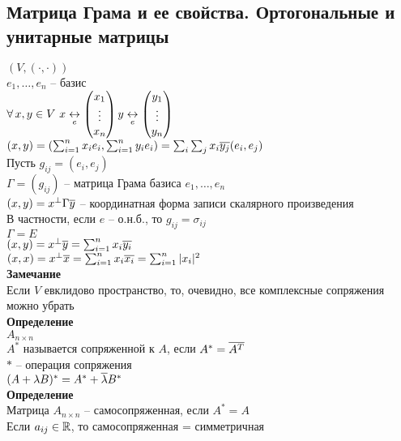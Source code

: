 \documentclass[12pt]{article}
\begin{document}
\subsection{Матрица Грама и ее свойства. Ортогональные и унитарные матрицы}
$(V, (\cdot, \cdot))$\\
$e_1, \ldots, e_n$ -- базис\\
$\forall\, x,y \in V\ x \underset e {\leftrightarrow} \begin{pmatrix}
    x_1\\\vdots\\x_n\\
\end{pmatrix}\\
    y \underset e {\leftrightarrow} \begin{pmatrix}
        y_1\\\vdots\\y_n
\end{pmatrix}$\\
$(x,y) = (\sum_{i=1}^n x_i e_i, \sum_{i=1}^n y_ie_i) = \sum_i \sum_j x_i \overline{y_j} (e_i, e_j)$\\
Пусть $g_{ij} = (e_i, e_j)$\\
$\Gamma = (g_{ij})$ -- матрица Грама базиса $e_1, \ldots, e_n$\\
$(x,y) = x^\perp \Gamma \overline y$ -- координатная форма записи скалярного произведения\\
В частности, если $e$ -- о.н.б., то $g_{ij} = \sigma_{ij}$\\
$\Gamma = E$\\
$(x, y) = x^\perp \overline y = \sum_{i=1}^n x_i \overline{y_i}$\\
$(x,x) = x^\perp \overline x = \sum_{i=1}^n x_i \overline{x_i} = \sum_{i=1}^n |x_i|^2$\\
\textbf{Замечание}\\
Если $V$ евклидово пространство, то, очевидно, все комплексные сопряжения можно убрать\\
\textbf{Определение}\\
$A_{n\times n}$\\
$A^*$ называется сопряженной к $A$, если $A^* = \overline{A^T}$\\
$*$ -- операция сопряжения\\
$(A+\lambda B)^* = A^* + \overline \lambda B^*$\\
\textbf{Определение}\\
Матрица $A_{n \times n}$ -- самосопряженная, если $A^* = A$\\
Если $a_{ij} \in \mathbb{R}$, то самосопряженная = симметричная\\
\end{document}
